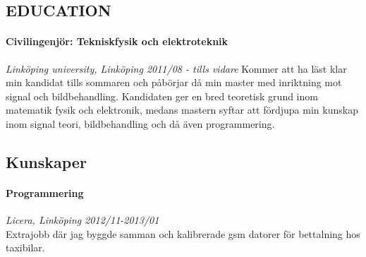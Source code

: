 \documentclass[11pt,fleqn]{article}
\begin{document}
\subsection*{EDUCATION}
\paragraph*{Civilingenjör: Tekniskfysik och elektroteknik} \textit{Linköping university, Linköping 2011/08 - tills vidare}
Kommer att ha läst klar min kandidat tills sommaren och påbörjar då min master med inriktning mot signal och bildbehandling. Kandidaten ger en bred teoretisk grund inom matematik fysik och elektronik, medans mastern syftar att fördjupa min kunskap inom signal teori, bildbehandling och då även programmering. 

\subsection*{Kunskaper}
\paragraph*{Programmering} \textit{Licera, Linköping 2012/11-2013/01} \\
Extrajobb där jag byggde samman och kalibrerade gsm datorer för bettalning hos taxibilar.
\end{document}
